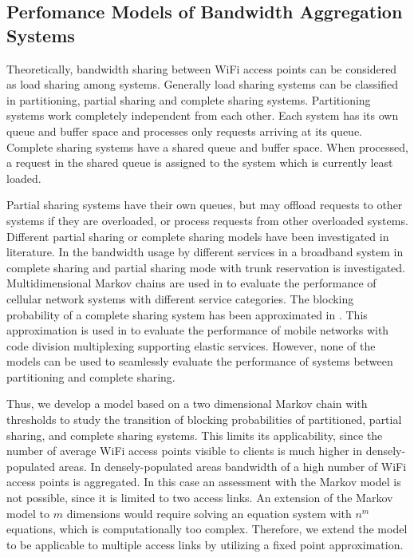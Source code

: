 \subsection{Perfomance Models of Bandwidth Aggregation Systems}\label{sec:aggregation:background:aggr}

Theoretically, bandwidth sharing between WiFi access points can be considered as load sharing among systems.
Generally load sharing systems can be classified in partitioning, partial sharing and complete sharing systems.
Partitioning systems work completely independent from each other.
Each system has its own queue and buffer space and processes only requests arriving at its queue.
Complete sharing systems have a shared queue and buffer space. When processed, a request in the shared queue is assigned to the system which is currently least loaded.

Partial sharing systems have their own queues, but may offload requests to other systems if they are overloaded, or process requests from other overloaded systems.
Different partial sharing or complete sharing models have been investigated in literature.
In \cite{trangia1993trunk} the bandwidth usage by different services in a broadband system in complete sharing and partial sharing mode with trunk reservation is investigated.
Multidimensional Markov chains are used in \cite{chen2002performance,zhang2006dynamic,ke2010performance} to evaluate the performance of cellular network systems with different service categories.
The blocking probability of a complete sharing system has been approximated in \cite{kaufman1992blocking}.
This approximation is used in \cite{fodor2007bounding} to evaluate the performance of mobile networks with code division multiplexing supporting elastic services.
However, none of the models can be used to seamlessly evaluate the performance of systems between partitioning and complete sharing.

Thus, we develop a model based on a two dimensional Markov chain with thresholds to study the transition of blocking probabilities of partitioned, partial sharing, and complete sharing systems.
This limits its applicability, since the number of average WiFi access points visible to clients is much higher in densely-populated areas.
In densely-populated areas bandwidth of a high number of WiFi access points is aggregated. In this case an assessment with the Markov model  is not possible, since it is limited to two access links. An extension of the Markov model to $m$ dimensions would require solving an equation system with $n^m$ equations, which is computationally too complex.
Therefore, we extend the model to be applicable to multiple access links by utilizing a fixed point approximation.

